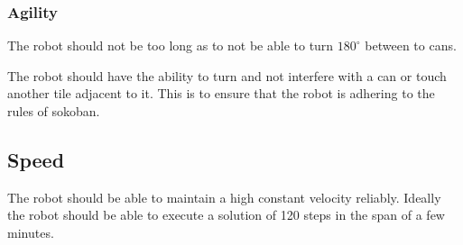 \documentclass[../../main.tex]{subfiles}
\begin{document}
\subsubsection{Agility}%
\label{ssub:agility}

The robot should not be too long as to not be able to turn $180^{\circ}$ between to cans.

The robot should have the ability to turn and not interfere with a can or touch another tile adjacent to it. This is to ensure that the robot is adhering to the rules of sokoban. 

\subsection{Speed}%
\label{sub:speed}

The robot should be able to maintain a high constant velocity reliably. Ideally the robot should be able to execute a solution of 120 steps in the span of a few minutes.

	
\end{document}
